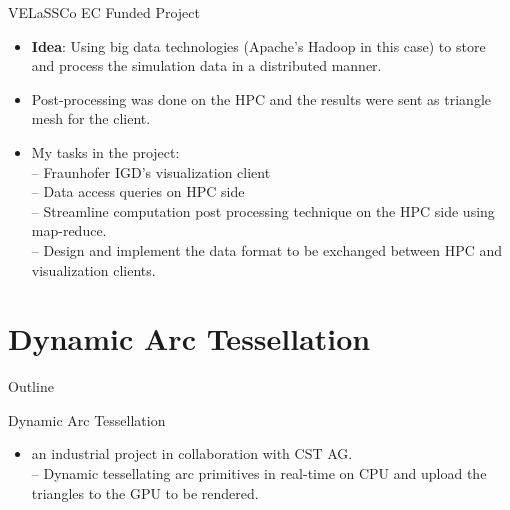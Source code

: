 \documentclass{beamer}
\begin{document}
\begin{frame}{VELaSSCo EC Funded Project}
	\begin{itemize}
		\item \textbf{Idea}: Using big data technologies (Apache's Hadoop in this case) to store and process the simulation data in a distributed manner.
		\item Post-processing was done on the HPC and the results were sent as triangle mesh for the client.
		\item My tasks in the project:\\
		-- Fraunhofer IGD's visualization client\\
		-- Data access queries on HPC side\\
		-- Streamline computation post processing technique on the HPC side using map-reduce.\\
		-- Design and implement the data format to be exchanged between HPC and visualization clients.\\
		
	\end{itemize}
\end{frame}

\section{Dynamic Arc Tessellation}

\begin{frame}{Outline}
\end{frame}

\begin{frame}{Dynamic Arc Tessellation}
	\begin{itemize}
		\item an industrial project in collaboration with CST AG.\\
		-- Dynamic tessellating arc primitives in real-time on CPU and upload the triangles to the GPU to be rendered.
	\end{itemize}
\end{frame}

\end{document}

